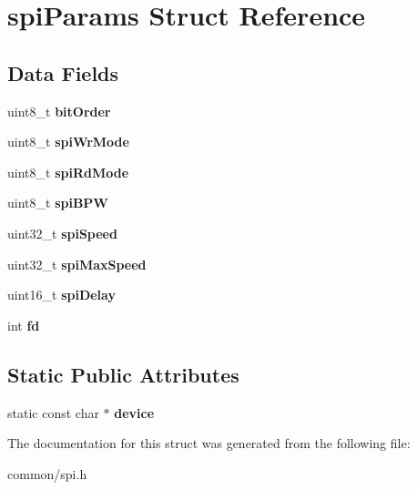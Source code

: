 \hypertarget{structspiParams}{\section{spi\-Params Struct Reference}
\label{structspiParams}
}
\subsection*{Data Fields}
\begin{DoxyCompactItemize}
\item 
\hypertarget{structspiParams_a943b444e77f506b67c26334326be4caf}{uint8\-\_\-t {\bfseries bit\-Order}}\label{structspiParams_a943b444e77f506b67c26334326be4caf}

\item 
\hypertarget{structspiParams_abf2bae4035ced0c45ced2618c2150d66}{uint8\-\_\-t {\bfseries spi\-Wr\-Mode}}\label{structspiParams_abf2bae4035ced0c45ced2618c2150d66}

\item 
\hypertarget{structspiParams_a24ce28ae11d13edb3cc2611790f74448}{uint8\-\_\-t {\bfseries spi\-Rd\-Mode}}\label{structspiParams_a24ce28ae11d13edb3cc2611790f74448}

\item 
\hypertarget{structspiParams_adfa9ae8f40748929cd125f2a2627a490}{uint8\-\_\-t {\bfseries spi\-B\-P\-W}}\label{structspiParams_adfa9ae8f40748929cd125f2a2627a490}

\item 
\hypertarget{structspiParams_a29a2a33adc949277f980d55c573bcb07}{uint32\-\_\-t {\bfseries spi\-Speed}}\label{structspiParams_a29a2a33adc949277f980d55c573bcb07}

\item 
\hypertarget{structspiParams_ac6af66e49fb2c4f84b4fd09e7f2df147}{uint32\-\_\-t {\bfseries spi\-Max\-Speed}}\label{structspiParams_ac6af66e49fb2c4f84b4fd09e7f2df147}

\item 
\hypertarget{structspiParams_a7d276b4bdd88c78495a6d87919ea9664}{uint16\-\_\-t {\bfseries spi\-Delay}}\label{structspiParams_a7d276b4bdd88c78495a6d87919ea9664}

\item 
\hypertarget{structspiParams_a75dcaec546d7e6c605f854871b6cf2ca}{int {\bfseries fd}}\label{structspiParams_a75dcaec546d7e6c605f854871b6cf2ca}

\end{DoxyCompactItemize}
\subsection*{Static Public Attributes}
\begin{DoxyCompactItemize}
\item 
\hypertarget{structspiParams_a6f2ed69ae1dc110d7cd3de5e6b145a94}{static const char $\ast$ {\bfseries device}}\label{structspiParams_a6f2ed69ae1dc110d7cd3de5e6b145a94}

\end{DoxyCompactItemize}


The documentation for this struct was generated from the following file\-:\begin{DoxyCompactItemize}
\item 
common/spi.\-h\end{DoxyCompactItemize}
